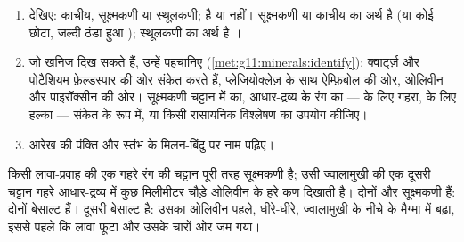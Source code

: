 
\begin{method}[आग्नेय चट्टान का नामकरण]\label{met:g11:igneous-rocks:naming}
\begin{enumerate}
  \item {} देखिए: काचीय, सूक्ष्मकणी या स्थूलकणी;
         है या नहीं। सूक्ष्मकणी या काचीय का अर्थ है  (या कोई
        छोटा, जल्दी ठंडा हुआ ); स्थूलकणी का अर्थ है ।
  \item जो खनिज दिख सकते हैं, उन्हें पहचानिए
        (\cref{met:g11:minerals:identify}): क्वार्ट्ज़ और पोटैशियम फ़ेल्डस्पार
         की ओर संकेत करते हैं, प्लेजियोक्लेज़ के साथ ऐम्फ़िबोल  की ओर, ओलिवीन
        और पाइरॉक्सीन  की ओर। सूक्ष्मकणी चट्टान में  का,
        आधार-द्रव्य के रंग का ---  के लिए गहरा,  के लिए हल्का ---
        संकेत के रूप में, या किसी रासायनिक विश्लेषण का उपयोग कीजिए।
  \item आरेख की पंक्ति और स्तंभ के मिलन-बिंदु पर नाम
        पढ़िए।
\end{enumerate}
\end{method}

\begin{example}[दो बेसाल्ट]
किसी लावा-प्रवाह की एक गहरे रंग की चट्टान पूरी तरह सूक्ष्मकणी है; उसी
ज्वालामुखी की एक दूसरी चट्टान गहरे आधार-द्रव्य में कुछ मिलीमीटर चौड़े ओलिवीन के हरे कण
दिखाती है। दोनों  और सूक्ष्मकणी हैं: दोनों बेसाल्ट हैं।
दूसरी  बेसाल्ट है: उसका ओलिवीन पहले, धीरे-धीरे, ज्वालामुखी के नीचे के
मैग्मा में बढ़ा, इससे पहले कि लावा फूटा और उसके चारों ओर जम गया।
\end{example}

